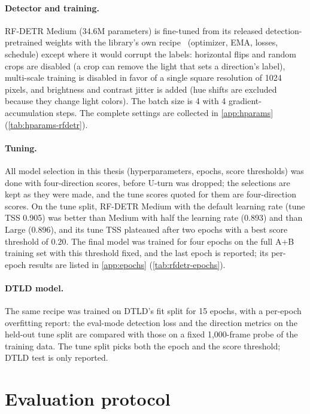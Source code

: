 \paragraph{Detector and training.} RF-DETR Medium (34.6M parameters) is fine-tuned from its released
detection-pretrained weights with the library's own recipe~ (optimizer, EMA, losses, schedule) except where it would corrupt
the labels: horizontal flips and random crops are disabled (a crop can remove the light that sets a
direction's label), multi-scale training is disabled in favor of a single square resolution of 1024
pixels, and brightness and contrast jitter is added (hue shifts are excluded because they change light
colors). The batch size is 4 with 4 gradient-accumulation steps. The complete settings are collected in
\cref{app:hparams} (\cref{tab:hparams-rfdetr}).

\paragraph{Tuning.} All model selection in this thesis (hyperparameters, epochs, score thresholds) was
done with four-direction scores, before U-turn was dropped; the selections are kept as they were made,
and the tune scores quoted for them are four-direction scores. On the tune split, RF-DETR Medium with
the default learning rate (tune TSS 0.905)
was better than Medium with half the learning rate (0.893) and than Large (0.896), and its tune TSS
plateaued after two epochs with a best score threshold of 0.20. The final model was trained for four
epochs on the full A+B training set with this threshold fixed, and the last epoch is reported; its
per-epoch results are listed in \cref{app:epochs} (\cref{tab:rfdetr-epochs}).

\paragraph{DTLD model.} The same recipe was trained on DTLD's fit split for 15 epochs, with a per-epoch
overfitting report: the eval-mode detection loss and the direction metrics on the held-out tune split
are compared with those on a fixed 1,000-frame probe of the training data. The tune split picks both
the epoch and the score threshold; DTLD test is only reported.

\section{Evaluation protocol}
\label{sec:method-eval}

